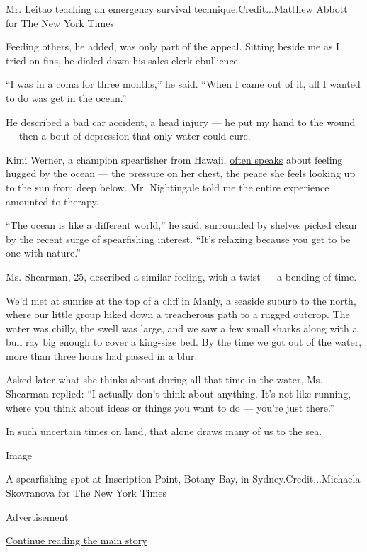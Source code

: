 Mr. Leitao teaching an emergency survival technique.Credit...Matthew
Abbott for The New York Times

Feeding others, he added, was only part of the appeal. Sitting beside me
as I tried on fins, he dialed down his sales clerk ebullience.

``I was in a coma for three months,'' he said. ``When I came out of it,
all I wanted to do was get in the ocean.''

He described a bad car accident, a head injury --- he put my hand to the
wound --- then a bout of depression that only water could cure.

Kimi Werner, a champion spearfisher from Hawaii,
\href{https://waterpeoplepodcast.com/2019/07/09/kimi-werner-flipping-your-instincts/}{often
speaks} about feeling hugged by the ocean --- the pressure on her chest,
the peace she feels looking up to the sun from deep below. Mr.
Nightingale told me the entire experience amounted to therapy.

``The ocean is like a different world,'' he said, surrounded by shelves
picked clean by the recent surge of spearfishing interest. ``It's
relaxing because you get to be one with nature.''

Ms. Shearman, 25, described a similar feeling, with a twist --- a
bending of time.

We'd met at sunrise at the top of a cliff in Manly, a seaside suburb to
the north, where our little group hiked down a treacherous path to a
rugged outcrop. The water was chilly, the swell was large, and we saw a
few small sharks along with a
\href{http://www.dpi.nsw.gov.au/__data/assets/pdf_file/0004/264775/Identifying-sharks-and-rays.pdf}{bull
ray} big enough to cover a king-size bed. By the time we got out of the
water, more than three hours had passed in a blur.

Asked later what she thinks about during all that time in the water, Ms.
Shearman replied: ``I actually don't think about anything. It's not like
running, where you think about ideas or things you want to do --- you're
just there.''

In such uncertain times on land, that alone draws many of us to the sea.

Image

A spearfishing spot at Inscription Point, Botany Bay, in
Sydney.Credit...Michaela Skovranova for The New York Times

Advertisement

\protect\hyperlink{after-bottom}{Continue reading the main story}

